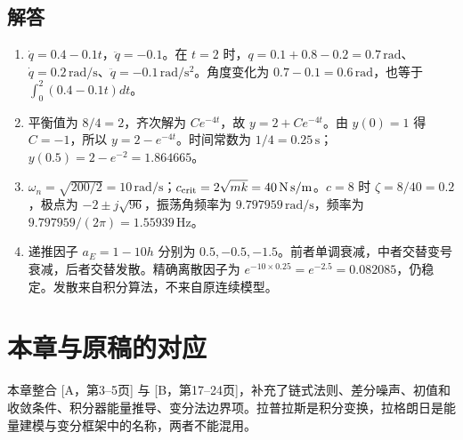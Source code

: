 \subsection*{解答}
\begin{enumerate}
\item $\dot q=0.4-0.1t$，$\ddot q=-0.1$。在 $t=2$ 时，$q=0.1+0.8-0.2=0.7\,\mathrm{rad}$、$\dot q=0.2\,\mathrm{rad/s}$、$\ddot q=-0.1\,\mathrm{rad/s^2}$。角度变化为 $0.7-0.1=0.6\,\mathrm{rad}$，也等于 $\int_0^2(0.4-0.1t)dt$。
\item 平衡值为 $8/4=2$，齐次解为 $Ce^{-4t}$，故 $y=2+Ce^{-4t}$。由 $y(0)=1$ 得 $C=-1$，所以 $y=2-e^{-4t}$。时间常数为 $1/4=0.25\,\mathrm s$；$y(0.5)=2-e^{-2}=1.864665$。
\item $\omega_n=\sqrt{200/2}=10\,\mathrm{rad/s}$；$c_{\rm crit}=2\sqrt{mk}=40\,\mathrm{N\,s/m}$。$c=8$ 时 $\zeta=8/40=0.2$，极点为 $-2\pm j\sqrt{96}$，振荡角频率为 $9.797959\,\mathrm{rad/s}$，频率为 $9.797959/(2\pi)=1.55939\,\mathrm{Hz}$。
\item 递推因子 $a_E=1-10h$ 分别为 $0.5,-0.5,-1.5$。前者单调衰减，中者交替变号衰减，后者交替发散。精确离散因子为 $e^{-10\times0.25}=e^{-2.5}=0.082085$，仍稳定。发散来自积分算法，不来自原连续模型。
\end{enumerate}

\section*{本章与原稿的对应}
本章整合 [A，第3--5页] 与 [B，第17--24页]，补充了链式法则、差分噪声、初值和收敛条件、积分器能量推导、变分法边界项。拉普拉斯是积分变换，拉格朗日是能量建模与变分框架中的名称，两者不能混用。
